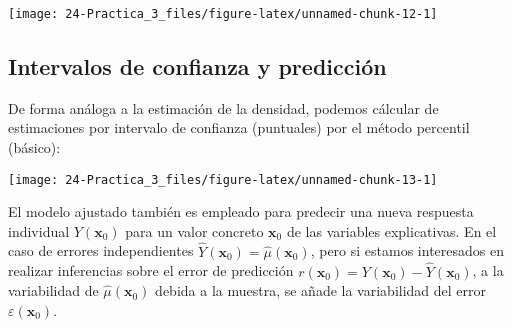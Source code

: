 \documentclass[
]{book}
\newenvironment{Shaded}{\begin{snugshade}}{\end{snugshade}}
\newcommand{\DataTypeTok}[1]{\textcolor[rgb]{0.13,0.29,0.53}{#1}}
\newcommand{\DecValTok}[1]{\textcolor[rgb]{0.00,0.00,0.81}{#1}}
\newcommand{\FloatTok}[1]{\textcolor[rgb]{0.00,0.00,0.81}{#1}}
\newcommand{\KeywordTok}[1]{\textcolor[rgb]{0.13,0.29,0.53}{\textbf{#1}}}
\newcommand{\NormalTok}[1]{#1}
\newcommand{\OperatorTok}[1]{\textcolor[rgb]{0.81,0.36,0.00}{\textbf{#1}}}
\newcommand{\StringTok}[1]{\textcolor[rgb]{0.31,0.60,0.02}{#1}}
\theoremstyle{definition}
\theoremstyle{definition}
\theoremstyle{definition}
\theoremstyle{remark}
\begin{document}
\begin{center}\texttt{[image: 24-Practica\_3\_files/figure-latex/unnamed-chunk-12-1]} \end{center}

\hypertarget{intervalos-de-confianza-y-predicciuxf3n}{%
\subsection{Intervalos de confianza y predicción}\label{intervalos-de-confianza-y-predicciuxf3n}}

De forma análoga a la estimación de la densidad, podemos cálcular de estimaciones
por intervalo de confianza (puntuales) por el método percentil (básico):

\begin{Shaded}
\end{Shaded}

\begin{center}\texttt{[image: 24-Practica\_3\_files/figure-latex/unnamed-chunk-13-1]} \end{center}

El modelo ajustado también es empleado para predecir una nueva respuesta individual
\(Y(\mathbf{x}_0)\) para un valor concreto \(\mathbf{x}_0\) de las variables explicativas.
En el caso de errores independientes \(\hat{Y}(\mathbf{x}_0) = \hat\mu(\mathbf{x}_0)\),
pero si estamos interesados en realizar inferencias sobre el error de predicción
\(r(\mathbf{x}_0) = Y(\mathbf{x}_0) - \hat{Y}(\mathbf{x}_0)\), a la variabilidad
de \(\hat\mu(\mathbf{x}_0)\) debida a la muestra, se añade la variabilidad del error
\(\varepsilon(\mathbf{x}_0)\).
\end{document}
